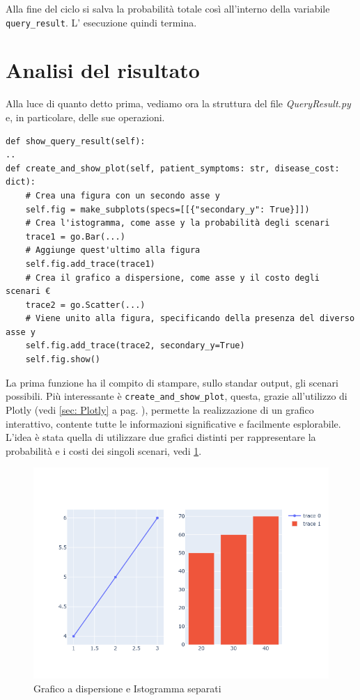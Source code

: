 Alla fine del ciclo si salva la probabilità totale così all'interno della variabile\\ \texttt{query_result}. L' esecuzione quindi termina.

\section{Analisi del risultato}
Alla luce di quanto detto prima, vediamo ora la struttura del file \emph{QueryResult.py} e, 
in particolare, delle sue operazioni.
\begin{verbatim}
def show_query_result(self):
..
def create_and_show_plot(self, patient_symptoms: str, disease_cost: dict):
	# Crea una figura con un secondo asse y
	self.fig = make_subplots(specs=[[{"secondary_y": True}]])
	# Crea l'istogramma, come asse y la probabilità degli scenari
	trace1 = go.Bar(...)
	# Aggiunge quest'ultimo alla figura
	self.fig.add_trace(trace1)
	# Crea il grafico a dispersione, come asse y il costo degli scenari €
	trace2 = go.Scatter(...)
	# Viene unito alla figura, specificando della presenza del diverso asse y
	self.fig.add_trace(trace2, secondary_y=True)	
	self.fig.show()
\end{verbatim}
La prima funzione ha il compito di stampare, sullo standar output, gli scenari possibili.
Più interessante è \texttt{create_and_show_plot}, questa, grazie all'utilizzo di
Plotly (vedi \ref{sec: Plotly} a pag. \pageref{sec: Plotly}), permette la realizzazione di un grafico
interattivo, contente tutte le informazioni significative e facilmente esplorabile.
L'idea è stata quella di utilizzare due grafici distinti per rappresentare la probabilità e 
i costi dei singoli scenari, vedi \ref{fig:duePlotDistinti}.\\
\begin{figure}[h]
	\includegraphics[width=\linewidth]{plot/plotly_two_graph.png}
	\caption{Grafico a dispersione e Istogramma separati}
	\centering
	\label{fig:duePlotDistinti}
\end{figure}
